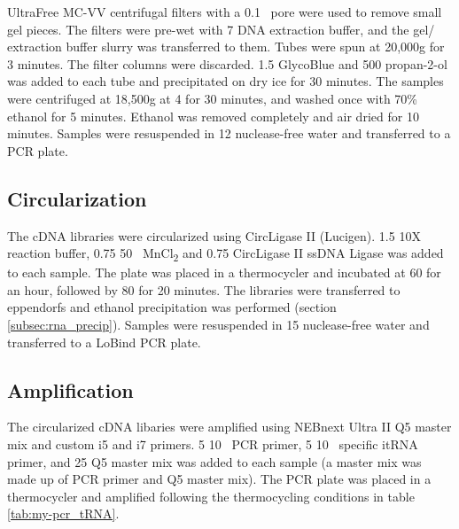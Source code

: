 UltraFree MC-VV centrifugal filters with a 0.1\si{\micro\Molar} pore were used to remove small gel pieces.
The filters were pre-wet with 7\ul{} DNA extraction buffer, and the gel/ extraction buffer slurry was transferred to them.
Tubes were spun at 20,000g for 3 minutes.
The filter columns were discarded.
1.5\ul{} GlycoBlue and 500\ul{} propan-2-ol was added to each tube and precipitated on dry ice for 30 minutes.
The samples were centrifuged at 18,500g at 4\C{} for 30 minutes, and washed once with 70\% ethanol for 5 minutes.
Ethanol was removed completely and air dried for 10 minutes.
Samples were resuspended in 12\ul{} nuclease-free water and transferred to a PCR plate.

\subsection{Circularization}
The cDNA libraries were circularized using CircLigase II (Lucigen).
1.5\ul{} 10X reaction buffer, 0.75\ul{} 50\si{\milli\Molar} MnCl\textsubscript{2} and 0.75\ul{} CircLigase II ssDNA Ligase was added to each sample.
The plate was placed in a thermocycler and incubated at 60\C{} for an hour, followed by 80\C{} for 20 minutes.
The libraries were transferred to eppendorfs and ethanol precipitation was performed (section \ref{subsec:rna_precip}).
Samples were resuspended in 15\ul{} nuclease-free water and transferred to a LoBind PCR plate.

\subsection{Amplification}
The circularized cDNA libaries were amplified using NEBnext Ultra II Q5 master mix and custom i5 and i7 primers.
5\ul{} 10\si{\micro\Molar} PCR primer, 5\ul{} 10\si{\micro\Molar} specific itRNA primer, and 25\ul{} Q5 master mix was added to each sample (a master mix was made up of PCR primer and Q5 master mix).
The PCR plate was placed in a thermocycler and amplified following the thermocycling conditions in table \ref{tab:my-pcr_tRNA}.

